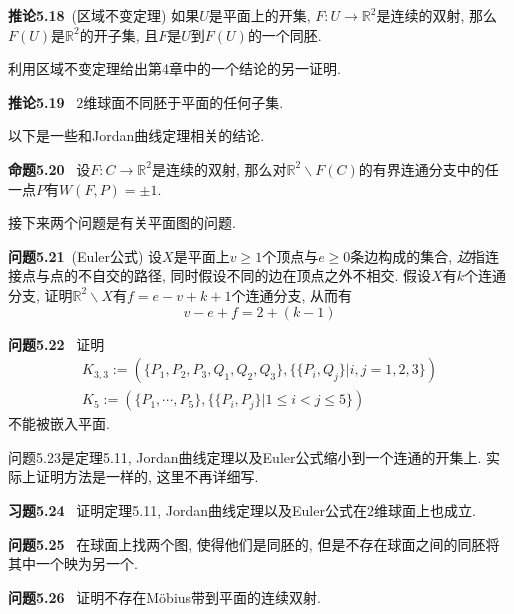 \documentclass[11pt]{article}
\theoremstyle{definition}\newtheorem*{analyse}{分析}
\theoremstyle{remark}\newtheorem{rem*}{评注}
\newenvironment{env}[1]{\par\vspace{1em}\noindent\textbf{#1}\ }{\par\vspace{1em}}
\begin{document}
\begin{env}{推论5.18}(区域不变定理)
    如果$U$是平面上的开集, $F:U\to\mathbb{R}^2$是连续的双射, 那么$F(U)$是$\mathbb{R}^2$的开子集, 且$F$是$U$到$F(U)$的一个同胚.
\end{env}

利用区域不变定理给出第4章中的一个结论的另一证明.
\begin{env}{推论5.19}
    $2$维球面不同胚于平面的任何子集.
\end{env}

以下是一些和Jordan曲线定理相关的结论.

\begin{env}{命题5.20}
    设$F:C\to\mathbb{R}^2$是连续的双射, 那么对$\mathbb{R}^2\backslash F(C)$的有界连通分支中的任一点$P$有$W(F,P)=\pm 1$.
\end{env}

接下来两个问题是有关平面图的问题.
\begin{env}{问题5.21}(Euler公式)
    设$X$是平面上$v\geq 1$个顶点与$e\geq 0$条边构成的集合, \textit{边}指连接点与点的不自交的路径, 同时假设不同的边在顶点之外不相交.
    假设$X$有$k$个连通分支, 证明$\mathbb{R}^2\backslash X$有$f=e-v+k+1$个连通分支, 从而有
    \[v-e+f=2+(k-1)\]
\end{env}

\begin{env}{问题5.22}
    证明
    \begin{gather*}
        K_{3,3}:=(\{P_1,P_2,P_3,Q_1,Q_2,Q_3\},\{\{P_i,Q_j\}|i,j=1,2,3\})\\
        K_5:=(\{P_1,\cdots,P_5\},\{\{P_i,P_j\}|1\leq i<j\leq 5\})
    \end{gather*}
    不能被嵌入平面.
\end{env}

问题5.23是定理5.11, Jordan曲线定理以及Euler公式缩小到一个连通的开集上.
实际上证明方法是一样的, 这里不再详细写.

\begin{env}{习题5.24}
    证明定理5.11, Jordan曲线定理以及Euler公式在$2$维球面上也成立.
\end{env}

\begin{env}{问题5.25}
    在球面上找两个图, 使得他们是同胚的, 但是不存在球面之间的同胚将其中一个映为另一个.
\end{env}

\begin{env}{问题5.26}
    证明不存在M\"{o}bius带到平面的连续双射.
\end{env}
\end{document}
